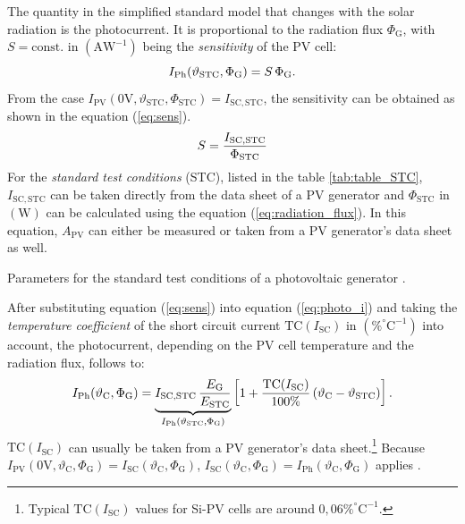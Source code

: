 The quantity in the simplified standard model that changes with the solar radiation is the photocurrent. It is proportional to the radiation flux $\Phi_{\mathrm{G}}$, with $S = \mathrm{const.}$ in $\left( \mathrm{A}\mathrm{W^{-1}} \right)$ being the \emph{sensitivity} of the PV cell:
	\begin{equation} \label{eq:photo_i}
	\centering
		I_{\mathrm{Ph}}(\vartheta_{\mathrm{STC}}, \Phi_{\mathrm{G}}) = S \, \Phi_{\mathrm{G}} \text{.}
	\end{equation}
From the case $I_{\mathrm{PV}}(0\mathrm{V}, \vartheta_{\mathrm{STC}}, \Phi_{\mathrm{STC}}) = I_\mathrm{SC,STC}$, the sensitivity can be obtained as shown in the equation (\ref{eq:sens}).
	\begin{equation} \label{eq:sens}
	\centering
		 S = \frac{I_\mathrm{SC,STC}}{\Phi_{\mathrm{STC}}}
	\end{equation}
For the \emph{standard test conditions} (STC), listed in the table \ref{tab:table_STC}, $I_\mathrm{SC,STC}$ can be taken directly from the data sheet of a PV generator and $\Phi_{\mathrm{STC}}$ in $\left( \mathrm{W} \right)$ can be calculated using the equation (\ref{eq:radiation_flux}). In this equation, $A_\mathrm{PV}$ can either be measured or taken from a PV generator's data sheet as well.
\begin{table}[h!]
	\centering
	
	\caption{Parameters for the standard test conditions of a photovoltaic generator \cite{Mertens:2015}.}
	\label{tab:table_STC}
\end{table}
After substituting equation (\ref{eq:sens}) into equation (\ref{eq:photo_i}) and taking the \emph{temperature coefficient} of the short circuit current $\mathrm{TC}(I_{\mathrm{SC}})$ in $\left( \% ^\circ \mathrm{C}^{-1} \right)$ into account, the photocurrent, depending on the PV cell temperature and the radiation flux, follows to:
	\begin{equation} \label{eq:i_ph_theta_phi}
	\centering
		 I_{\mathrm{Ph}}(\vartheta_{\mathrm{C}}, \Phi_{\mathrm{G}}) = \underbrace{I_{\mathrm{SC,STC}} \, \frac{E_\mathrm{G}}{E_\mathrm{STC}}}_{I_{\mathrm{Ph}}(\vartheta_{\mathrm{STC}}, \Phi_{\mathrm{G}})} \left[ 1 + \frac{\mathrm{TC}(I_{\mathrm{SC}})}{100\%} \left(\vartheta_{\mathrm{C}} - \vartheta_{\mathrm{STC}} \right) \right] \text{.}
	\end{equation}
$\mathrm{TC}(I_{\mathrm{SC}})$ can usually be taken from a PV generator's data sheet.\footnote{Typical $\mathrm{TC}(I_{\mathrm{SC}})$ values for Si-PV cells are around $0,06 \% ^\circ \mathrm{C}^{-1}$.} Because $I_{\mathrm{PV}}(0\mathrm{V}, \vartheta_{\mathrm{C}}, \Phi_{\mathrm{G}}) = I_{\mathrm{SC}}(\vartheta_{\mathrm{C}}, \Phi_{\mathrm{G}})$, $I_{\mathrm{SC}}(\vartheta_{\mathrm{C}}, \Phi_{\mathrm{G}}) = I_{\mathrm{Ph}}(\vartheta_{\mathrm{C}}, \Phi_{\mathrm{G}})$ applies \cite{Mertens:2015, Tietze:2016, Wagner:2018}. 

